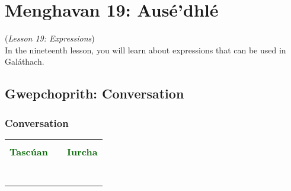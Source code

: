 \section{Menghavan 19: Aus\'{e'}dhl\'{e}}
(\textit{Lesson 19: Expressions})\\

In the nineteenth lesson, you will learn about expressions that can be used in Gal\'{a}thach.

\subsection{Gwepchoprith: Conversation}
\subsubsection{Conversation}

\begin{table}[H]
\centering
    \begin{tabular}{M{3.0cm}M{10.0cm}M{3.0cm}}
     &  & \\
    \textcolor{darkgreen}{\textbf{Tasc\'{u}an}} &  & \textcolor{darkgreen}{\textbf{Iurcha}}\\
     &  & \\
     &  & \\
     &  & \\
     &  & \\
     &  & \\
     &  & \\
     &  & 
    \end{tabular}
\end{table}

